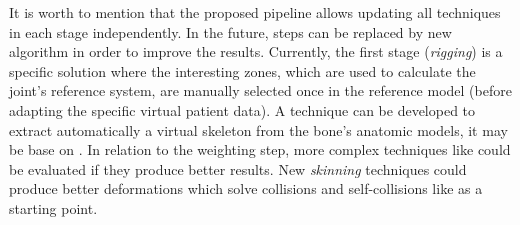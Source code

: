 


It is worth to mention that the proposed pipeline allows updating all techniques in each stage independently. In the future, steps can be replaced by new algorithm in order to improve the results.
Currently, the first stage (\emph{rigging}) is a specific solution where the interesting zones, which are used to calculate the joint's reference system, are manually selected once in the reference model (before adapting the specific virtual patient data). A technique can be developed to extract automatically a virtual skeleton from the bone's anatomic models, it may be base on \cite{Tagliasacchi}.
In relation to the weighting step, more complex techniques like \cite{Jacobson:2011} could be evaluated if they produce better results.
New \emph{skinning} techniques could produce better deformations which solve collisions and self-collisions like \cite{Vaillant:2014} as a starting point.
